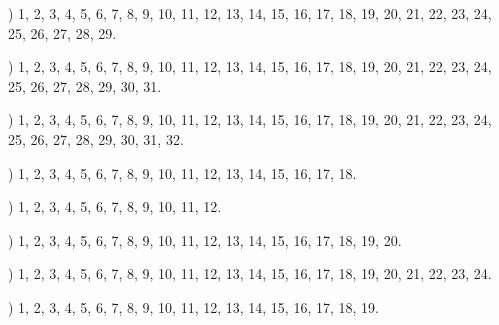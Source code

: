 \documentclass[a4paper,11pt]{article}
\begin{document}
\noindent
{}) 1, 2, 3, 4, 5, 6, 7, 8, 9, 10, 11, 12, 13, 14, 15, 16,
17, 18, 19, 20, 21, 22, 23, 24, 25, 26, 27, 28, 29.

\vspace{\spaceFour}



\noindent
{}) 1, 2, 3, 4, 5, 6, 7, 8, 9, 10, 11, 12, 13, 14, 15, 16,
17, 18, 19, 20, 21, 22, 23, 24, 25, 26, 27, 28, 29, 30, 31.

\vspace{\spaceFour}



\noindent
{}) 1, 2, 3, 4, 5, 6, 7, 8, 9, 10, 11, 12, 13, 14, 15, 16,
17, 18, 19, 20, 21, 22, 23, 24, 25, 26, 27, 28, 29, 30, 31, 32.

\vspace{\spaceFour}



\noindent
{}) 1, 2, 3, 4, 5, 6, 7, 8, 9, 10, 11, 12, 13, 14, 15, 16,
17, 18.


\vspace{\spaceTwo}












\noindent {}) 1, 2, 3, 4, 5, 6, 7, 8, 9, 10, 11, 12.

\vspace{\spaceFour}



\noindent
{}) 1, 2, 3, 4, 5, 6, 7, 8, 9, 10, 11, 12, 13, 14, 15, 16,
17, 18, 19, 20.

\vspace{\spaceFour}



\noindent
{}) 1, 2, 3, 4, 5, 6, 7, 8, 9, 10, 11, 12, 13, 14, 15, 16,
17, 18, 19, 20, 21, 22, 23, 24.

\vspace{\spaceFour}



\noindent
{}) 1, 2, 3, 4, 5, 6, 7, 8, 9, 10, 11, 12, 13, 14, 15, 16,
17, 18, 19.
\end{document}
